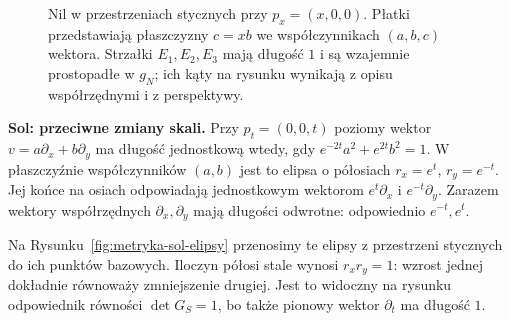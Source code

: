 \begin{figure}[H]
\centering
{}
\caption{Nil w przestrzeniach stycznych przy $p_x=(x,0,0)$.
Płatki przedstawiają płaszczyzny $c=xb$ we współczynnikach
$(a,b,c)$ wektora. Strzałki $E_1,E_2,E_3$ mają długość $1$
i są wzajemnie prostopadłe w $g_N$; ich kąty na rysunku
wynikają z opisu współrzędnymi i z perspektywy.}
\label{fig:metryka-nil-plaszczyzny}
\end{figure}

\textbf{Sol: przeciwne zmiany skali.}
Przy $p_t=(0,0,t)$ poziomy wektor
$v=a\partial_x+b\partial_y$ ma długość jednostkową wtedy,
gdy $e^{-2t}a^2+e^{2t}b^2=1$.
W płaszczyźnie współczynników $(a,b)$ jest to elipsa
o półosiach $r_x=e^t$, $r_y=e^{-t}$.
Jej końce na osiach odpowiadają jednostkowym wektorom
$e^t\partial_x$ i $e^{-t}\partial_y$.
Zarazem wektory współrzędnych $\partial_x,\partial_y$
mają długości odwrotne: odpowiednio $e^{-t},e^t$.

Na Rysunku~\ref{fig:metryka-sol-elipsy} przenosimy
te elipsy z przestrzeni stycznych do ich punktów bazowych.
Iloczyn półosi stale wynosi $r_xr_y=1$:
wzrost jednej dokładnie równoważy zmniejszenie drugiej.
Jest to widoczny na rysunku odpowiednik równości $\det G_S=1$,
bo także pionowy wektor $\partial_t$ ma długość $1$.

